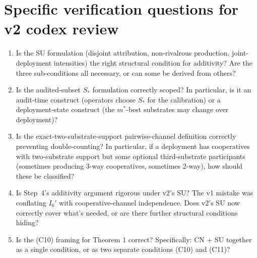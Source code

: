 \documentclass{article}
\newcommand{\Saudit}{S_*}
\begin{document}
\section{Specific verification questions for v2 codex review}

\begin{enumerate}
\item Is the SU formulation (disjoint attribution, non-rivalrous
  production, joint-deployment intensities) the right structural
  condition for additivity?  Are the three sub-conditions all
  necessary, or can some be derived from others?

\item Is the audited-subset $\Saudit$ formulation correctly
  scoped?  In particular, is it an audit-time construct (operators
  choose $\Saudit$ for the calibration) or a deployment-state
  construct (the $m^*$-best substrates may change over deployment)?

\item Is the exact-two-substrate-support pairwise-channel
  definition correctly preventing double-counting?  In particular,
  if a deployment has cooperatives with two-substrate support but
  some optional third-substrate participants (sometimes producing
  3-way cooperatives, sometimes 2-way), how should these be
  classified?

\item Is Step~4's additivity argument rigorous under v2's SU?
  The v1 mistake was conflating $I_6'$ with cooperative-channel
  independence.  Does v2's SU now correctly cover what's needed,
  or are there further structural conditions hiding?

\item Is the (C10) framing for Theorem 1 correct?  Specifically:
  CN + SU together as a single condition, or as two separate
  conditions (C10) and (C11)?
\end{enumerate}
\end{document}

